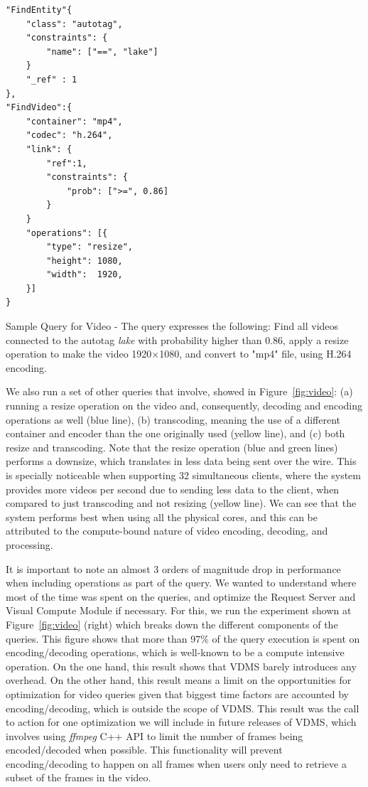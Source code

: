 \begin{listing}[ht!]
\begin{verbatim}
"FindEntity"{     
    "class": "autotag",
    "constraints": { 
        "name": ["==", "lake"]
    }
    "_ref" : 1
},
"FindVideo":{
    "container": "mp4",
    "codec": "h.264",
    "link": {
        "ref":1,
        "constraints": {
            "prob": [">=", 0.86]
        }
    }
    "operations": [{
        "type": "resize",
        "height": 1080,
        "width":  1920,
    }]
}

\end{verbatim}
\caption{Sample Query for Video - 
The query expresses the following: 
Find all videos connected to the autotag \textit{lake} 
with probability higher than 0.86, apply a resize operation
to make the video 1920×1080, and convert to "mp4" file, 
using H.264 encoding.} 
\label{findvideo}
\end{listing}

We also run a set of other queries that involve, showed in Figure~\ref{fig:video}:
(a) running a resize operation on the video and, consequently,
decoding and encoding operations as well (blue line),
(b) transcoding, meaning the use of a different container and encoder
than the one originally used (yellow line), and
(c) both resize and transcoding.
Note that the resize operation (blue and green lines) performs a downsize,
which translates in less data being sent over the wire.
This is specially noticeable when supporting 32 simultaneous clients, 
where the system provides more videos per second due to sending less data to 
the client, when compared to just transcoding and not resizing (yellow line).
We can see that the system performs best when using all the physical cores,
and this can be attributed to the compute-bound nature of video
encoding, decoding, and processing.

It is important to note an almost 3 orders of magnitude drop in performance
when including operations as part of the query.
We wanted to understand where most of the time was spent on the queries,
and optimize the Request Server and Visual Compute Module
if necessary. For this, we run the experiment shown at
Figure~\ref{fig:video} (right) which breaks down the different components of the
queries. This figure shows that more than 97\% of the query execution is spent
on encoding/decoding operations, which is well-known to be a
compute intensive operation\cite{videosgoogle}.
On the one hand, this result shows that VDMS barely introduces any overhead. 
On the other hand, this result means a limit on the opportunities 
for optimization for video queries given that biggest time factors 
are accounted by encoding/decoding, which is outside the scope of VDMS.
This result was the call to action for one optimization we will include
in future releases of VDMS, which involves using \textit{ffmpeg} C++ API to
limit the number of frames being encoded/decoded when possible.
This functionality will prevent encoding/decoding to happen on all frames
when users only need to retrieve a subset of the frames in the video.

